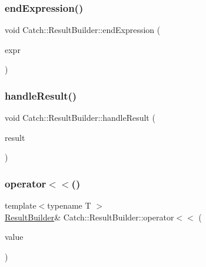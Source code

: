 \mbox{\label{class_catch_1_1_result_builder_a864e03b7300271de7cc44b9864463c5a}} 
\subsubsection{\texorpdfstring{end\+Expression()}{endExpression()}}
{\footnotesize\ttfamily void Catch\+::\+Result\+Builder\+::end\+Expression (\begin{DoxyParamCaption}\item[{\hyperlink{struct_catch_1_1_decomposed_expression}{Decomposed\+Expression} const \&}]{expr }\end{DoxyParamCaption})}

\mbox{\label{class_catch_1_1_result_builder_ad8bb17e4ac590b75bf8630d8f3502f4e}} 
\subsubsection{\texorpdfstring{handle\+Result()}{handleResult()}}
{\footnotesize\ttfamily void Catch\+::\+Result\+Builder\+::handle\+Result (\begin{DoxyParamCaption}\item[{\hyperlink{class_catch_1_1_assertion_result}{Assertion\+Result} const \&}]{result }\end{DoxyParamCaption})}

\mbox{\label{class_catch_1_1_result_builder_a5aa79ce6160ab8cd800eb65bbd7a28a4}} 
\subsubsection{\texorpdfstring{operator$<$$<$()}{operator<<()}}
{\footnotesize\ttfamily template$<$typename T $>$ \\
\hyperlink{class_catch_1_1_result_builder}{Result\+Builder}\& Catch\+::\+Result\+Builder\+::operator$<$$<$ (\begin{DoxyParamCaption}\item[{T const \&}]{value }\end{DoxyParamCaption})\hspace{0.3cm}{\ttfamily [inline]}}

